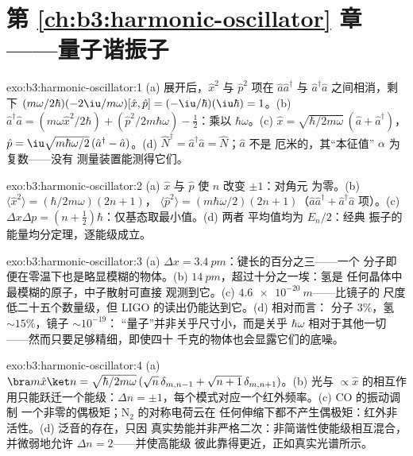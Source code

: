 \section*{第 \ref{ch:b3:harmonic-oscillator} 章——量子谐振子}

\begin{solution}{exo:b3:harmonic-oscillator:1}
(a) 展开后，$\hat x^2$ 与 $\hat p^2$ 项在
$\hat a\hat a^\dagger$ 与 $\hat a^\dagger\hat a$ 之间相消，剩下
$(m\omega/2\hbar)(-2\iu/m\omega)[\hat x, \hat p] =
(-\iu/\hbar)(\iu\hbar) = 1$。(b) $\hat a^\dagger\hat a = (m\omega\hat x^2/2\hbar) +
(\hat p^2/2m\hbar\omega) - \tfrac12$：乘以 $\hbar\omega$。(c)
$\hat x = \sqrt{\hbar/2m\omega}\,(\hat a + \hat a^\dagger)$，$\hat p
= \iu\sqrt{m\hbar\omega/2}\,(\hat a^\dagger - \hat a)$。(d) $\hat
N^\dagger = \hat a^\dagger\hat a = \hat N$；$\hat a$ 不是
厄米的，其“本征值” $\alpha$ 为复数——没有
测量装置能测得它们。
\end{solution}

\begin{solution}{exo:b3:harmonic-oscillator:2}
(a) $\hat x$ 与 $\hat p$ 使 $n$ 改变 $\pm1$：对角元
为零。(b) $\langle\hat x^2\rangle = (\hbar/2m\omega)(2n + 1)$，
$\langle\hat p^2\rangle = (m\hbar\omega/2)(2n + 1)$（$\hat
a\hat a^\dagger + \hat a^\dagger\hat a$ 项）。(c) $\Delta x\Delta p
= (n + \tfrac12)\hbar$：仅基态取最小值。(d) 两者
平均值均为 $E_n/2$：经典
振子的能量均分定理，逐能级成立。
\end{solution}

\begin{solution}{exo:b3:harmonic-oscillator:3}
(a) $\Delta x = \qty{3.4}{pm}$：键长的百分之三——一个
分子即便在零温下也是略显模糊的物体。(b)
$\qty{14}{pm}$，超过十分之一埃：氢是
任何晶体中最模糊的原子，中子散射可直接
观测到它。(c) $\qty{4.6e-20}{m}$——比镜子的
尺度低二十五个数量级，但 LIGO 的读出仍能达到它。(d) 相对而言：
分子 $3\%$，氢 $\sim15\%$，镜子 $\sim10^{-19}$：
“量子”并非关乎尺寸小，而是关乎 $\hbar\omega$
相对于其他一切——然而只要足够精细，即使四十
千克的物体也会显露它们的底噪。
\end{solution}

\begin{solution}{exo:b3:harmonic-oscillator:4}
(a) $\bra m\hat x\ket n = \sqrt{\hbar/2m\omega}\,(\sqrt n\,
\delta_{m,n-1} + \sqrt{n + 1}\,\delta_{m,n+1})$。(b) 光与
$\propto\hat x$ 的相互作用只能跃迁一个能级：$\Delta n =
\pm1$，每个模式对应一个红外频率。(c) CO 的振动调制
一个非零的偶极矩；N$_2$ 的对称电荷云在
任何伸缩下都不产生偶极矩：红外非活性。(d) 泛音的存在，只因
真实势能并非严格二次：非简谐性使能级相互混合，
并微弱地允许 $\Delta n = 2$——并使高能级
彼此靠得更近，正如真实光谱所示。
\end{solution}

